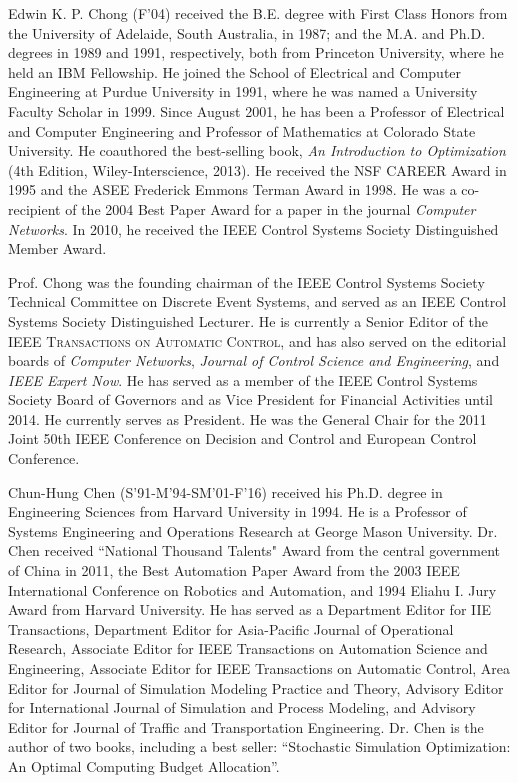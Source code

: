 \documentclass[journal]{IEEEtran}
\begin{document}
\begin{IEEEbiographynophoto}{Edwin K. P. Chong}
(F'04) received the B.E. degree with First Class Honors from the University of Adelaide, South Australia, in 1987; and the M.A. and Ph.D. degrees in 1989 and 1991, respectively, both from Princeton University, where he held an IBM Fellowship. He joined the School of Electrical and Computer Engineering at Purdue University in 1991, where he was named a University Faculty Scholar in 1999. Since August 2001, he has been a Professor of Electrical and Computer Engineering and Professor of Mathematics at Colorado State University.  He coauthored the best-selling book, \emph{An Introduction to Optimization} (4th Edition, Wiley-Interscience, 2013). He received the NSF CAREER Award in 1995 and the ASEE Frederick Emmons Terman Award in 1998. He was a co-recipient of the 2004 Best Paper Award for a paper in the journal \emph{Computer Networks}. In 2010, he received the IEEE Control Systems Society Distinguished Member Award.

Prof. Chong was the founding chairman of the IEEE Control Systems Society Technical Committee on Discrete Event Systems, and served as an IEEE Control Systems Society Distinguished Lecturer. He is currently a Senior Editor of the \textsc{IEEE Transactions on Automatic Control}, and has also served on the editorial boards of \emph{Computer Networks}, \emph{Journal of Control Science and Engineering}, and \emph{IEEE Expert Now}. He has served as a member of the IEEE Control Systems Society Board of Governors and as Vice President for Financial Activities until 2014. He currently serves as President.  He was the General Chair for the 2011 Joint 50th IEEE Conference on Decision and Control and European Control Conference.
\end{IEEEbiographynophoto}


\begin{IEEEbiographynophoto}{Chun-Hung Chen}
(S'91-M'94-SM'01-F'16) received his Ph.D. degree in Engineering Sciences from Harvard University in 1994. He is a Professor of Systems Engineering and Operations Research at George Mason University. Dr. Chen received “National Thousand Talents" Award from the central government of China in 2011, the Best Automation Paper Award from the 2003 IEEE International Conference on Robotics and Automation, and 1994 Eliahu I. Jury Award from Harvard University. He has served as a Department Editor for IIE Transactions, Department Editor for Asia-Pacific Journal of Operational Research, Associate Editor for IEEE Transactions on Automation Science and Engineering, Associate Editor for IEEE Transactions on Automatic Control, Area Editor for Journal of Simulation Modeling Practice and Theory, Advisory Editor for International Journal of Simulation and Process Modeling, and Advisory Editor for Journal of Traffic and Transportation Engineering. Dr. Chen is the author of two books, including a best seller: “Stochastic Simulation Optimization: An Optimal Computing Budget Allocation”.
\end{IEEEbiographynophoto}
\end{document}

